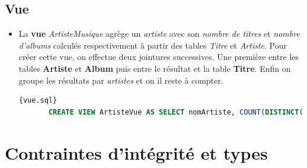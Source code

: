 \documentclass[a4paper,12pt, french]{report}
\begin{document}
  \subsection{Vue}
    \begin{itemize}
       \item  La \textbf{vue} \emph{ArtisteMusique} agrège un \emph{artiste} avec son \emph{nombre de titres} et \emph{nombre d'albums} calculés respectivement à partir des tables \emph{Titre} et \emph{Artiste}.
       Pour créer cette vue, on effectue deux jointures successives. Une première entre les tables \textbf{Artiste} et \textbf{Album} puis entre le résultat et la table \textbf{Titre}. Enfin on groupe les résultats par \emph{artistes} et on il reste à compter.
       \begin{lstlisting}[language=SQL, label=creation-vue,caption=Création de la vue , breaklines, frame=single]{vue.sql}
       CREATE VIEW ArtisteVue AS SELECT nomArtiste, COUNT(DISTINCT(nomAlbum)) AS nbAlbums, COUNT(DISTINCT(nomTitre)) AS nbTitres FROM (SELECT art.nom AS nomArtiste, alb.nom AS nomAlbum, tit.nom AS nomTitre FROM ARTISTE art INNER JOIN ALBUM alb ON alb.nomartiste = art.nom INNER JOIN TITRE tit on tit.nomAlbum=alb.nom) v group by v.nomArtiste;
       \end{lstlisting}
       
    \end{itemize}

\section{Contraintes d'intégrité et types}
\end{document}
